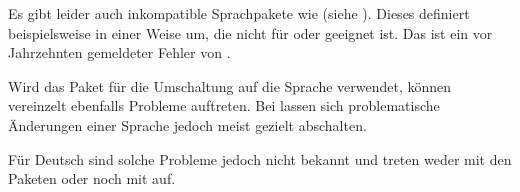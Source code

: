 \iffalse%
Erlauben\textnote{Achtung!} Sie mir noch einen Hinweis zu den
Sprachumschaltpaketen. Das Paket
\Package{french}\IndexPackage{french}\important{\Package{french}} (siehe
\cite{package:french}) nimmt neben der Umdefinierung der Begriffe aus
\autoref{tab:\LabelBase.languageTerms},
\autopageref{tab:\LabelBase.languageTerms} weitere Änderungen vor. So
definiert es etwa die Anweisung \DescRef{scrlttr2.cmd.opening} um. Dabei geht
es einfach davon aus, dass \DescRef{scrlttr2.cmd.opening} immer wie in der
Standardbriefklasse \Class{letter} definiert ist. Dies ist bei \KOMAScript{}
jedoch nicht der Fall. Das Paket \Package{french} zerstört deshalb die
Definition und arbeitet nicht korrekt mir \KOMAScript{} zusammen. Ich
betrachte dies als Fehler des Pakets \Package{french}, der obwohl schon vor
Jahrzehnten gemeldet, leider nie beseitigt wurde.%
\else%
Es gibt leider auch inkompatible Sprachpakete wie
 (siehe
\cite{package:french}). Dieses definiert beispielsweise
 in einer Weise um, die nicht für
 oder  geeignet ist. Das ist ein vor
Jahrzehnten gemeldeter Fehler von .%
\fi

Wird das Paket  für die
Umschaltung auf die Sprache verwendet, können vereinzelt ebenfalls
Probleme auftreten. Bei  lassen sich problematische Änderungen
einer Sprache jedoch meist gezielt abschalten.%
\iftrue%
\iftrue
  Für Deutsch sind solche Probleme jedoch nicht bekannt  und treten weder
  mit den Paketen  oder
   noch mit  auf.
\else
  Für Deutsch treten solche Probleme mit den Paketen
  \Package{german}\IndexPackage{german},
  \Package{ngerman}\IndexPackage{ngerman} oder \Package{babel} jedoch nicht
  auf.
\fi
\fi

